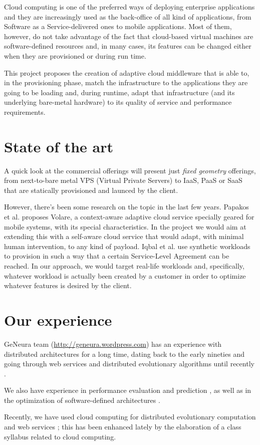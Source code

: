 \documentclass[a4paper]{article}
\begin{document}
Cloud computing is one of the preferred ways of deploying enterprise
applications and they are increasingly used as the back-office of all
kind of applications, from Software as a Service-delivered ones to
mobile applications. Most of them, however, do not take advantage of
the fact that cloud-based virtual machines are software-defined
resources and, in many cases, its features can be changed either when
they are provisioned or during run time.

This project proposes the creation of adaptive cloud middleware that
is able to, in the provisioning phase, match the infrastructure to
the applications they are going to be loading and, during runtime,
adapt that infrastructure (and its underlying bare-metal hardware) to
its quality of service and performance requirements. 

\section{State of the art}

A quick look at the commercial offerings will present just {\em fixed
  geometry} offerings, from next-to-bare metal VPS (Virtual Private
Servers) to IaaS, PaaS or SaaS that are statically provisioned and
launced by the client.

However, there's been some research on the topic in the last few
years. Papakos et al. \cite{Papakos} proposes
Volare, a context-aware adaptive cloud service specially geared for
mobile systems, with its special characteristics. In the project we
would aim at extending this with a self-aware cloud service that would
adapt, with minimal human intervention, to any kind of payload. Iqbal
et al. \cite{Iqbal2011871} use synthetic workloads to provision in
such a way that a certain Service-Level Agreement can be reached. In
our approach, we would target real-life workloads and, specifically,
whatever workload is actually been created by a customer in order to
optimize whatever features is desired by the client.

\section{Our experience}

GeNeura team (\url{http://geneura.wordpress.com}) has an experience with
distributed architectures for a long time, dating back to the early
nineties \cite{parallel90} and going through web services and
distributed evolutionary algorithms until recently
\cite{Jini:FEA2000,agajaj,LNCS44480129,Araujo2010}.

We also have experience in performance evaluation and prediction
\cite{castillo:evostar08,hardwareevo}, as well as in the optimization of
software-defined architectures \cite{gecco08:castillo}.

Recently, we have used cloud computing for distributed evolutionary
computation \cite{sofea:naco,mericloud} and web services
\cite{DBLP:journals/soco/Garcia-SanchezGCAG13}; this has been enhanced
lately 
by the elaboration of a class syllabus related to cloud computing. 




\end{document}
